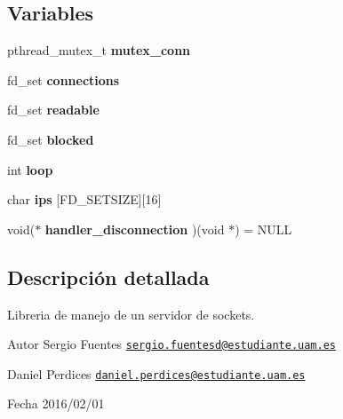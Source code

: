 \subsection*{Variables}
\begin{DoxyCompactItemize}
\item 
\hypertarget{G-2301-01-P1-server_8c_a3e20fc3c81d523926af308f1eda8c6ed}{}pthread\+\_\+mutex\+\_\+t {\bfseries mutex\+\_\+conn}\label{G-2301-01-P1-server_8c_a3e20fc3c81d523926af308f1eda8c6ed}

\item 
\hypertarget{G-2301-01-P1-server_8c_a6283fbbf9527feb09c480c58e599495b}{}fd\+\_\+set {\bfseries connections}\label{G-2301-01-P1-server_8c_a6283fbbf9527feb09c480c58e599495b}

\item 
\hypertarget{G-2301-01-P1-server_8c_a31beab6ddd8eda55ae837b29236bd9b1}{}fd\+\_\+set {\bfseries readable}\label{G-2301-01-P1-server_8c_a31beab6ddd8eda55ae837b29236bd9b1}

\item 
\hypertarget{G-2301-01-P1-server_8c_aec5ad857bd2eba81e93a95b22a26e3e8}{}fd\+\_\+set {\bfseries blocked}\label{G-2301-01-P1-server_8c_aec5ad857bd2eba81e93a95b22a26e3e8}

\item 
\hypertarget{G-2301-01-P1-server_8c_ad667f040f2932c8097435492fbd10d76}{}int {\bfseries loop}\label{G-2301-01-P1-server_8c_ad667f040f2932c8097435492fbd10d76}

\item 
\hypertarget{G-2301-01-P1-server_8c_a8657a01a43c08d4aa4e3f81fe5037ed7}{}char {\bfseries ips} \mbox{[}F\+D\+\_\+\+S\+E\+T\+S\+I\+Z\+E\mbox{]}\mbox{[}16\mbox{]}\label{G-2301-01-P1-server_8c_a8657a01a43c08d4aa4e3f81fe5037ed7}

\item 
\hypertarget{G-2301-01-P1-server_8c_a548ed1dfb87cfa9069558252488af26a}{}void($\ast$ {\bfseries handler\+\_\+disconnection} )(void $\ast$) = N\+U\+L\+L\label{G-2301-01-P1-server_8c_a548ed1dfb87cfa9069558252488af26a}

\end{DoxyCompactItemize}


\subsection{Descripción detallada}
Libreria de manejo de un servidor de sockets. 

\begin{DoxyAuthor}{Autor}
Sergio Fuentes \href{mailto:sergio.fuentesd@estudiante.uam.es}{\tt sergio.\+fuentesd@estudiante.\+uam.\+es} 

Daniel Perdices \href{mailto:daniel.perdices@estudiante.uam.es}{\tt daniel.\+perdices@estudiante.\+uam.\+es} 
\end{DoxyAuthor}
\begin{DoxyDate}{Fecha}
2016/02/01 
\end{DoxyDate}


